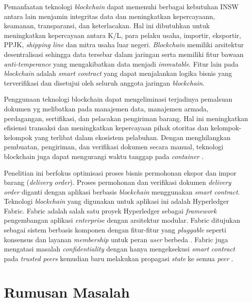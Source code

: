 Pemanfaatan teknologi \textit{blockchain} dapat memenuhi berbagai kebutuhan INSW antara lain menjamin integritas data dan meningkatkan kepercayaann, keamanan, transparansi, dan keterlacakan. Hal ini dibutuhkan untuk meningkatkan kepercayaan antara K/L, para pelaku usaha, importir, eksportir, PPJK, \textit{shipping line} dan mitra usaha luar negeri. \textit{Blockchain} memiliki arsitektur desentralisasi sehingga data tersebar dalam jaringan serta memiliki fitur bawaan \textit{anti-temperance} yang mengakibatkan data menjadi \textit{immutable}. Fitur lain pada \textit{blockchain} adalah \textit{smart contract} yang dapat menjalankan logika bisnis yang terverifikasi dan disetujui oleh seluruh anggota jaringan \textit{blockchain}.

Penggunaan teknologi blockchain dapat mengeliminasi terjadinya pemalsuan dokumen yg melibatkan pada manajemen data, manajemen armada, perdagangan, sertifikasi, dan pelacakan pengiriman barang. Hal ini meningkatkan efisiensi transaksi dan meningkatkan kepercayaan pihak otoritas dan kelompok-kelompok yang terlibat dalam ekosistem pelabuhan. Dengan menghilangkan pembuatan, pengiriman, dan verifikasi dokumen secara manual, teknologi blockchain juga dapat mengurangi waktu tanggap pada \textit{container} \citep{Ahmad2021}.

Penelitian ini berfokus optimisasi proses bisnis permohonan ekspor dan impor barang (\textit{delivery order}). Proses permohonan dan verifikasi dokumen \textit{delivery order} diganti dengan aplikasi berbasis \textit{blockchain} menggunakan \textit{smart contract}. Teknologi \textit{blockchain} yang digunakan untuk aplikasi ini adalah Hyperledger Fabric. Fabric adalah salah satu proyek Hyperledger sebagai \textit{framework} pengembangan aplikasi \textit{enterprise} dengan arsitektur modular. Fabric ditujukan sebagai sistem berbasis komponen dengan fitur-fitur yang \textit{pluggable} seperti konsensus dan layanan \textit{membership} untuk peran \textit{user} berbeda \cite{Dhillon2017}. Fabric juga mengatasi masalah \textit{confidentiality} dengan hanya mengeksekusi \textit{smart contract} pada \textit{trusted peers} kemudian baru melakukan propagasi \textit{state} ke semua \textit{peer} \cite{Androulaki2018}. 

\section{Rumusan Masalah}
\label{sec:masalah}

